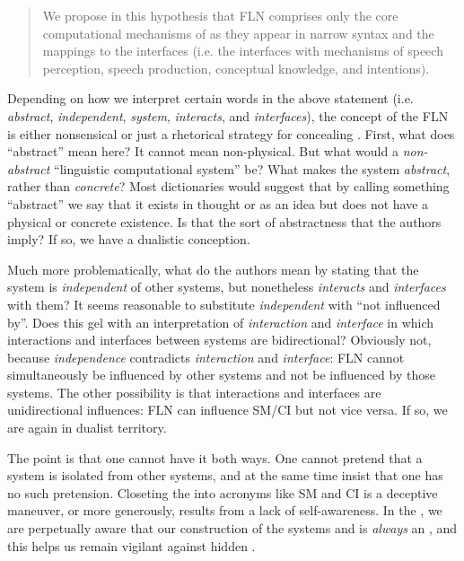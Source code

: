 \begin{quote}
We propose in this hypothesis that FLN comprises only the core computational mechanisms of  as they appear in narrow  syntax and the mappings to the interfaces (i.e. the interfaces with mechanisms of speech perception, speech production, conceptual  knowledge, and intentions).\\\hbox{}\hfill{}\hbox{\citep{HauserEtAl2002}}
\end{quote}

  Depending on how we interpret certain words in the above statement (i.e. \textit{abstract}, \textit{independent}, \textit{system}, \textit{interacts}, and \textit{interfaces}), the concept of the FLN is either nonsensical or just a rhetorical strategy for concealing . First, what does “abstract” mean here? It cannot mean non-physical. But what would a \textit{non-abstract} “linguistic computational system” be? What makes the system \textit{abstract}, rather than \textit{concrete}? Most dictionaries would suggest that by calling something “abstract” we say that it exists in thought or as an idea but does not have a physical or concrete existence. Is that the sort of abstractness that the authors imply? If so, we have a dualistic conception. 

  Much more problematically, what do the authors mean by stating that the system is \textit{independent} of other systems, but nonetheless \textit{interacts} and \textit{interfaces} with them? It seems reasonable to substitute \textit{independent} with “not influenced by”. Does this gel with an interpretation of \textit{interaction} and \textit{interface} in which interactions and interfaces between systems are bidirectional? Obviously not, because \textit{independence} contradicts \textit{interaction} and \textit{interface}: FLN cannot simultaneously be influenced by other systems and not be influenced by those systems. The other possibility is that interactions and interfaces are unidirectional influences: FLN can influence SM/CI but not vice versa. If so, we are again in dualist territory. 

  The point is that one cannot have it both ways. One cannot pretend that a system is isolated from other systems, and at the same time insist that one has no such pretension. Closeting the  into acronyms like SM and CI is a deceptive maneuver, or more generously, results from a lack of self-awareness. In the , we are perpetually aware that our construction of the systems and  is \textit{always} an , and this helps us remain vigilant against hidden .

